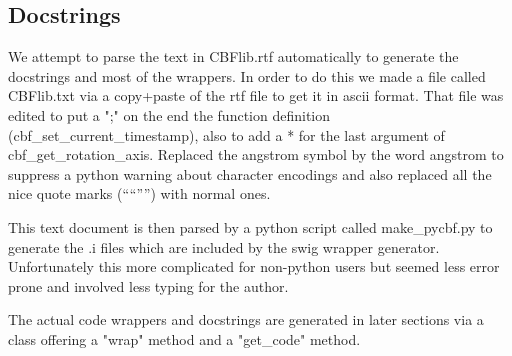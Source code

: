 \documentclass[10pt,a4paper,twoside,notitlepage]{article}
\begin{document}
\subsection{Docstrings}

We attempt to parse the text in CBFlib.rtf automatically to generate the docstrings 
and most of the wrappers.
In order to do this we made a file called CBFlib.txt via a copy+paste of the 
rtf file to get it in ascii format.
That file was edited to put a ";" on the end the function definition
(cbf\_set\_current\_timestamp), also to add a * for the last argument of 
cbf\_get\_rotation\_axis. Replaced the angstrom symbol by the word
angstrom to suppress a python warning about character encodings and
also replaced all the nice quote marks (````'''') with normal ones.

This text document is then parsed by a python script called make\_pycbf.py 
to generate the .i files which are included by the swig wrapper generator.
Unfortunately this more complicated for non-python users but seemed less
error prone and involved less typing for the author.


The actual code wrappers and docstrings are generated in later sections via
a class offering a "wrap" method and a "get\_code" method.
\end{document}

